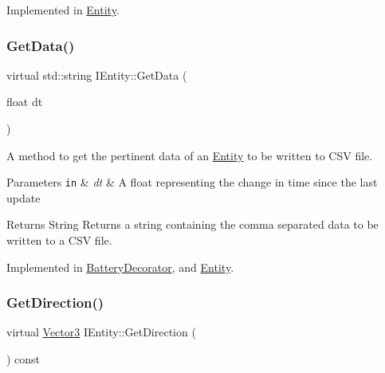 Implemented in \hyperlink{classEntity_a13e0fdabb9f5ae73ecd4d7bf7834a3a9}{Entity}.

\mbox{\label{classIEntity_a4d9355e68c6be349f57dc67fc1c036ba}} 
\subsubsection{\texorpdfstring{Get\+Data()}{GetData()}}
{\footnotesize\ttfamily virtual std\+::string I\+Entity\+::\+Get\+Data (\begin{DoxyParamCaption}\item[{float}]{dt }\end{DoxyParamCaption})\hspace{0.3cm}{\ttfamily [pure virtual]}}



A method to get the pertinent data of an \hyperlink{classEntity}{Entity} to be written to C\+SV file. 


\begin{DoxyParams}[1]{Parameters}
\mbox{\tt in}  & {\em dt} & A float representing the change in time since the last update\\
\hline
\end{DoxyParams}
\begin{DoxyReturn}{Returns}
String Returns a string containing the comma separated data to be written to a C\+SV file. 
\end{DoxyReturn}


Implemented in \hyperlink{classBatteryDecorator_a47475a9179285e30e8c18316cebdac9f}{Battery\+Decorator}, and \hyperlink{classEntity_a25fcdac45c906ba995f427ce6facab96}{Entity}.

\mbox{\label{classIEntity_aa99a8fef8b22195a5113c38ef51f086d}} 
\subsubsection{\texorpdfstring{Get\+Direction()}{GetDirection()}}
{\footnotesize\ttfamily virtual \hyperlink{classVector3}{Vector3} I\+Entity\+::\+Get\+Direction (\begin{DoxyParamCaption}{ }\end{DoxyParamCaption}) const\hspace{0.3cm}{\ttfamily [pure virtual]}}



